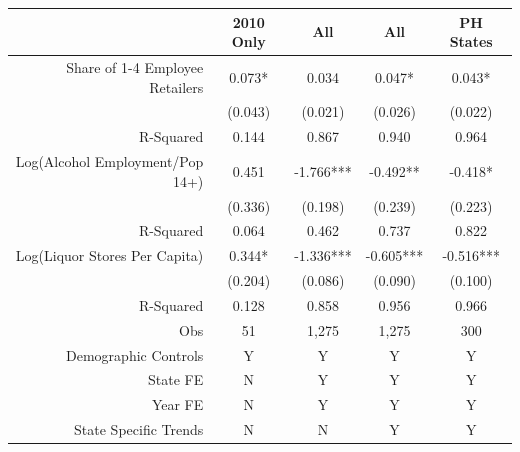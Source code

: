 \begin{tabular}{rrrrr}
\hline \hline
      & \multicolumn{1}{c}{2010 Only} & \multicolumn{1}{c}{All} & \multicolumn{1}{c}{All} & \multicolumn{1}{c}{PH States} \\
\hline
      Share of 1-4 Employee Retailers & \multicolumn{1}{c}{0.073*} & \multicolumn{1}{c}{0.034} & \multicolumn{1}{c}{0.047*} & \multicolumn{1}{c}{0.043*} \\
      & \multicolumn{1}{c}{(0.043)} & \multicolumn{1}{c}{(0.021)} & \multicolumn{1}{c}{(0.026)} & \multicolumn{1}{c}{(0.022)} \\
R-Squared & \multicolumn{1}{c}{0.144} & \multicolumn{1}{c}{0.867} & \multicolumn{1}{c}{0.940} & \multicolumn{1}{c}{0.964} \\
\hline
      Log(Alcohol Employment/Pop 14+) & \multicolumn{1}{c}{0.451} & \multicolumn{1}{c}{-1.766***} & \multicolumn{1}{c}{-0.492**} & \multicolumn{1}{c}{-0.418*} \\
      & \multicolumn{1}{c}{(0.336)} & \multicolumn{1}{c}{(0.198)} & \multicolumn{1}{c}{(0.239)} & \multicolumn{1}{c}{(0.223)} \\
R-Squared & \multicolumn{1}{c}{0.064} & \multicolumn{1}{c}{0.462} & \multicolumn{1}{c}{0.737} & \multicolumn{1}{c}{0.822} \\
\hline
      Log(Liquor Stores Per Capita) & \multicolumn{1}{c}{0.344*} & \multicolumn{1}{c}{-1.336***} & \multicolumn{1}{c}{-0.605***} & \multicolumn{1}{c}{-0.516***} \\
      & \multicolumn{1}{c}{(0.204)} & \multicolumn{1}{c}{(0.086)} & \multicolumn{1}{c}{(0.090)} & \multicolumn{1}{c}{(0.100)} \\
R-Squared & \multicolumn{1}{c}{0.128} & \multicolumn{1}{c}{0.858} & \multicolumn{1}{c}{0.956} & \multicolumn{1}{c}{0.966} \\
\hline
Obs   & \multicolumn{1}{c}{51} & \multicolumn{1}{c}{1,275} & \multicolumn{1}{c}{1,275} & \multicolumn{1}{c}{300} \\
Demographic Controls & \multicolumn{1}{c}{Y}     & \multicolumn{1}{c}{Y}     & \multicolumn{1}{c}{Y}     & \multicolumn{1}{c}{Y} \\
State FE & \multicolumn{1}{c}{N}     & \multicolumn{1}{c}{Y}     & \multicolumn{1}{c}{Y}     & \multicolumn{1}{c}{Y} \\
Year FE & \multicolumn{1}{c}{N}     & \multicolumn{1}{c}{Y}     & \multicolumn{1}{c}{Y}     & \multicolumn{1}{c}{Y} \\
State Specific Trends & \multicolumn{1}{c}{N}     & \multicolumn{1}{c}{N}     & \multicolumn{1}{c}{Y}     & \multicolumn{1}{c}{Y}  \\ \hline \hline
\end{tabular}
